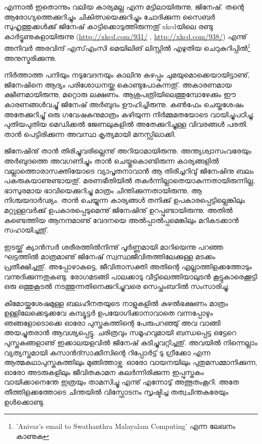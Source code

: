 എന്നാല്‍ ഇതൊന്നും വലിയ കാര്യമല്ല എന്ന മട്ടിലായിരുന്നു, ജിനേഷ്. തന്റെ ആരോഗ്യത്തെക്കുറിച്ചും ചികിത്സയെക്കുറിച്ചും 
ചോദിക്കുന്ന സൈബര്‍ സുഹൃത്തുക്കള്‍ക്കു് ജിനേഷ് കാട്ടിക്കൊടുത്തിരുന്നതു് xkcdയിലെ രണ്ടു കാര്‍ട്ടൂണുകളായിരുന്നു 
(\url{http://xkcd.com/931/}  , \url{http://xkcd.com/938/}) എന്നു് അനിവര്‍ അരവിന്ദ് എസ്എംസി മെയിലിങ് ലിസ്റ്റില്‍ എഴുതിയ 
ചെറുകുറിപ്പില്‍\footnote{'Anivar's email to Swathanthra Malayalam Computing' എന്ന ലേഖനം കാണുക} അനുസ്മരിക്കുന്നു. 

നിര്‍ത്താത്ത പനിയും നടുവേദനയും കാലിനു കഴപ്പും ചുമയുമൊക്കെയായിട്ടാണു്, ജിനേഷിനെ ആദ്യം പരിശോധനയ്ക്കു 
കൊണ്ടുപോകുന്നതു്. അകാരണമായ ക്ഷീണമായിരുന്നു, മറ്റൊരു ലക്ഷണം. ആശുപത്രിയിലെത്തുമ്പോഴേക്കും ഈ 
കാരണങ്ങള്‍വച്ചു് ജിനേഷ് അര്‍ബുദം ഊഹിച്ചിരുന്നു. കണ്‍ഫേം ചെയ്തശേഷം അതേക്കുറിച്ചു് ഒരു ഗവേഷകനുമാത്രം 
കഴിയുന്ന നിര്‍മ്മമതയോടെ വായിച്ചുപഠിച്ചു. പുതിയപുതിയ മെഡിക്കല്‍ ജേണലുകളില്‍ അതേക്കുറിച്ചുള്ള വിവരങ്ങള്‍ പരതി. 
താന്‍ പെട്ടിരിക്കുന്ന അവസ്ഥ കൃത്യമായി മനസ്സിലാക്കി.

ജിനേഷിനു് താന്‍ തിരിച്ചുവരില്ലെന്നു് അറിയാമായിരുന്നു. അന്ത്യശ്വാസംവരേയും അര്‍ബുദത്തെ അവഗണിച്ചും താന്‍ 
ചെയ്തുകൊണ്ടിരുന്ന കാര്യങ്ങളില്‍ വല്ലാത്തൊരാസക്തിയോടെ വ്യാപൃതനാവാന്‍ ആ തിരിച്ചറിവു് ജിനേഷിനു ബലം 
പകരുകയാണുണ്ടായതു്. മരണഭീതിയില്‍ തകര്‍ന്നില്ലാതെയാകുന്നതായിരുന്നില്ല, ഭാസുരമായ ഭാവിയെക്കുറിച്ചു മാത്രം 
ചിന്തിക്കുന്നതായിരുന്നു, ആ നിശ്ചയദാര്‍ഢ്യം. താന്‍ ചെയ്യുന്ന കാര്യങ്ങള്‍ തനിക്കു് ഉപകാരപ്പെട്ടില്ലെങ്കിലും മറ്റുള്ളവര്‍ക്കു് 
ഉപകാരപ്പെടുമെന്നു് ജിനേഷിനു് ഉറപ്പുണ്ടായിരുന്നു. അതില്‍ കണ്ടെത്തിയ ആനന്ദമാണു് വേദനയെ അല്‍പ്പാല്‍പ്പമെങ്കിലും 
മറികടക്കാന്‍ സഹായിച്ചതു്.

ഇടയ്ക്കു് ക്യാന്‍സര്‍ ശരീരത്തില്‍നിന്നു് പൂര്‍ണ്ണമായി മാറിയെന്നു പറഞ്ഞ ഘട്ടത്തില്‍ മാത്രമാണു് ജിനേഷ് 
സ്വസ്ഥജീവിതത്തിലേക്കുള്ള മടക്കം പ്രതീക്ഷിച്ചതു്. അപ്പോഴാകട്ടെ, ജീവിതാസക്തി അതിന്റെ എല്ലാത്തിളക്കത്തോടും 
വന്നുദിക്കുന്നതുകണ്ടു. രോഗമടങ്ങി പാലക്കാടു വീട്ടിലെത്തിയാലുടന്‍ കൂട്ടുകാരെക്കൂട്ടി ഒരു ഒത്തുകൂടല്‍ നടത്തുന്നതിനെക്കുറിച്ചുവരെ 
സെപ്തംബറില്‍ സംസാരിച്ചു.

കീമോയ്ക്കുശേഷമുള്ള ബലഹീനതയുടെ നാളുകളില്‍ കുഴല്‍ഭക്ഷണം മാത്രം ഉള്ളിലേക്കെടുക്കവേ കമ്പ്യൂട്ടര്‍ ഉപയോഗിക്കാനാവാതെ 
വന്നപ്പോഴും ഞങ്ങളോടൊക്കെ ഓരോ പുസ്തകത്തിന്റെ പേരുപറഞ്ഞു് അവ വാങ്ങി അയച്ചുതരാന്‍ ആവശ്യപ്പെട്ടു. ചരിത്രവും 
സമൂഹവുമായി ബന്ധപ്പെട്ട ഒട്ടേറെ പുസ്തകങ്ങളാണു് ഇക്കാലയളവില്‍ ജിനേഷ് കുടിച്ചുവറ്റിച്ചതു്. അവയില്‍ നിന്നെല്ലാം 
വ്യത്യസ്തമായി കസാന്‍ദ്സാക്കീസിന്റെ റിപ്പോര്‍ട്ട് ടു ഗ്രീക്കോ എന്ന ആത്മകഥാപുസ്തകത്തിലും മുങ്ങിത്താഴ്ന്നു. ഓരോ വായനയിലും 
പുതുമസമ്മാനിക്കുന്ന, ഓരോ അടരുകളിലും ജീവിതകാമന കലര്‍ന്നിരിക്കുന്ന ഇപ്പുസ്തകം വായിക്കാനെന്തേ ഇത്രയും താമസിച്ചൂ 
എന്നു് എന്നോടു് അത്ഭുതംകൂറി.   അതേ തീത്തിളക്കത്തോടെ ചിന്തയില്‍ വിസ്ഫോടനം സൃഷ്ടിച്ച തത്വചിന്തകരേയും ഉള്‍ക്കൊണ്ടു.

